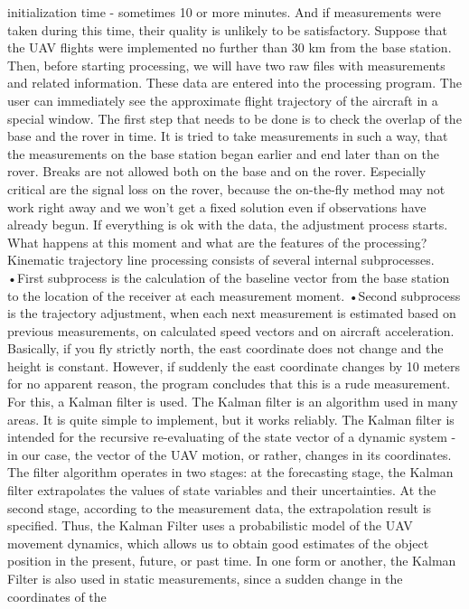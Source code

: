 \documentclass[
  letterpaper,
  DIV=11,
  numbers=noendperiod]{scrreprt}
\begin{document}
initialization time - sometimes 10 or more minutes. And if measurements
were taken during this time, their quality is unlikely to be
satisfactory. Suppose that the UAV flights were implemented no further
than 30 km from the base station. Then, before starting processing, we
will have two raw files with measurements and related information. These
data are entered into the processing program. The user can immediately
see the approximate flight trajectory of the aircraft in a special
window. The first step that needs to be done is to check the overlap of
the base and the rover in time. It is tried to take measurements in such
a way, that the measurements on the base station began earlier and end
later than on the rover. Breaks are not allowed both on the base and on
the rover. Especially critical are the signal loss on the rover, because
the on-the-fly method may not work right away and we won't get a fixed
solution even if observations have already begun. If everything is ok
with the data, the adjustment process starts. What happens at this
moment and what are the features of the processing? Kinematic trajectory
line processing consists of several internal subprocesses. •First
subprocess is the calculation of the baseline vector from the base
station to the location of the receiver at each measurement moment.
•Second subprocess is the trajectory adjustment, when each next
measurement is estimated based on previous measurements, on calculated
speed vectors and on aircraft acceleration. Basically, if you fly
strictly north, the east coordinate does not change and the height is
constant. However, if suddenly the east coordinate changes by 10 meters
for no apparent reason, the program concludes that this is a rude
measurement. For this, a Kalman filter is used. The Kalman filter is an
algorithm used in many areas. It is quite simple to implement, but it
works reliably. The Kalman filter is intended for the recursive
re-evaluating of the state vector of a dynamic system - in our case, the
vector of the UAV motion, or rather, changes in its coordinates. The
filter algorithm operates in two stages: at the forecasting stage, the
Kalman filter extrapolates the values of state variables and their
uncertainties. At the second stage, according to the measurement data,
the extrapolation result is specified. Thus, the Kalman Filter uses a
probabilistic model of the UAV movement dynamics, which allows us to
obtain good estimates of the object position in the present, future, or
past time. In one form or another, the Kalman Filter is also used in
static measurements, since a sudden change in the coordinates of the
\end{document}
